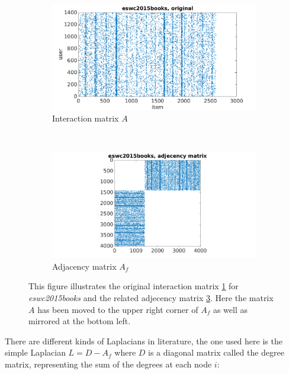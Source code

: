 \begin{figure}[h!]
    \begin{subfigure}[h!]{0.5\textwidth}
        \includegraphics[width=\textwidth]{fig/spectral_data/eswc2015books_original.png}
        \caption{Interaction matrix $A$}
        \label{fig:spec:book:orig}
    \end{subfigure}
    ~
    \begin{subfigure}[h!]{0.5\textwidth}
        \includegraphics[width=\textwidth]{fig/spectral_data/eswc2015books_adj.png}
        \caption{Adjacency matrix $A_f$}
        \label{fig:spec:book:adj}
    \end{subfigure}
    \caption{This figure illustrates the original interaction matrix \ref{fig:spec:book:orig} for \textit{eswc2015books} and the related adjecency matrix \ref{fig:spec:book:adj}. Here the matrix $A$ has been moved to the upper right corner of $A_f$ as well as mirrored at the bottom left.}
\end{figure}

There are different kinds of Laplacians in literature, the one used here is the simple Laplacian $L = D - A_f$ where $D$ is a diagonal matrix called the degree matrix, representing the sum of the degrees at each node $i$:

